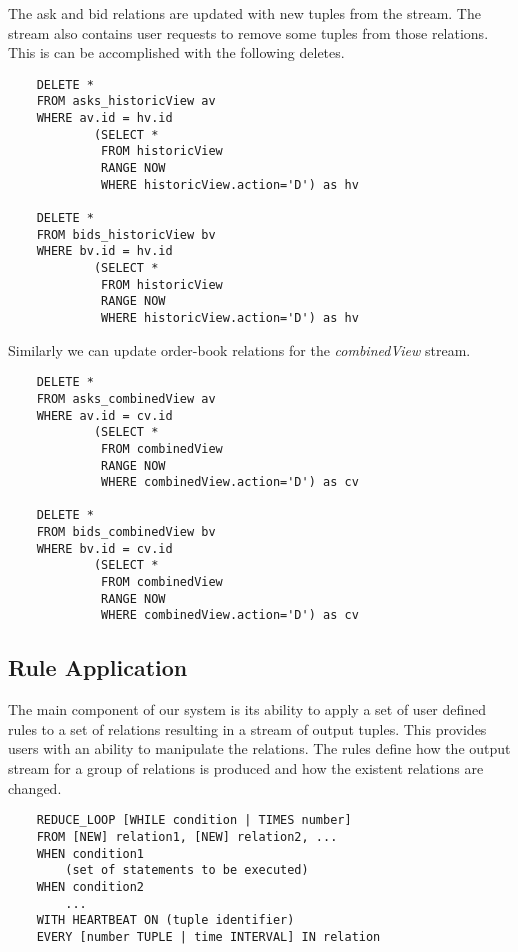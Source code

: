 \documentclass{article}
\begin{document}
\noindent The ask and bid relations are updated with new tuples from the stream. The stream also contains user requests to remove some tuples from those relations. This is can be accomplished with the following deletes.

\begin{verbatim}  
    DELETE *
    FROM asks_historicView av
    WHERE av.id = hv.id
            (SELECT * 
             FROM historicView
             RANGE NOW
             WHERE historicView.action='D') as hv  

    DELETE *
    FROM bids_historicView bv
    WHERE bv.id = hv.id
            (SELECT * 
             FROM historicView
             RANGE NOW
             WHERE historicView.action='D') as hv 
\end{verbatim}

Similarly we can update order-book relations for the \emph{combinedView} stream.

\begin{verbatim}  
    DELETE *
    FROM asks_combinedView av
    WHERE av.id = cv.id
            (SELECT * 
             FROM combinedView
             RANGE NOW
             WHERE combinedView.action='D') as cv  

    DELETE *
    FROM bids_combinedView bv
    WHERE bv.id = cv.id
            (SELECT * 
             FROM combinedView
             RANGE NOW
             WHERE combinedView.action='D') as cv 
\end{verbatim}


\subsection{Rule Application}

The main component of our system is its ability to apply a set of user defined rules to a set of relations resulting in a stream of output tuples. This provides users with an ability to manipulate the relations. The rules define how the output stream for a group of relations is produced and how the existent relations are changed. 

\begin{verbatim}
    REDUCE_LOOP [WHILE condition | TIMES number]
    FROM [NEW] relation1, [NEW] relation2, ... 
    WHEN condition1
        (set of statements to be executed)
    WHEN condition2
        ...
    WITH HEARTBEAT ON (tuple identifier)
    EVERY [number TUPLE | time INTERVAL] IN relation 
\end{verbatim}
\end{document}
